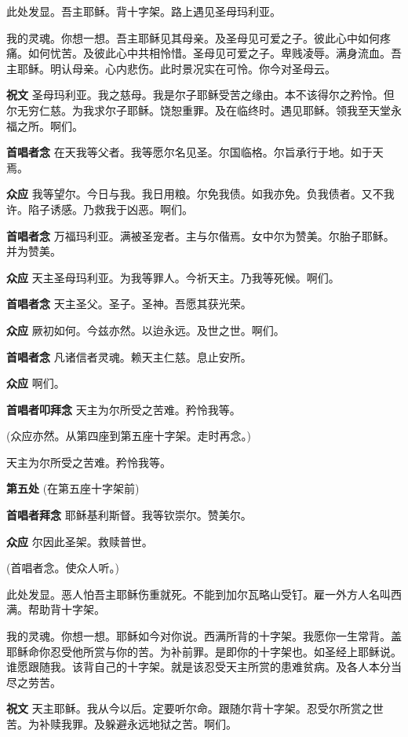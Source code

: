 \documentclass[UTF8,17pt]{ctexart}
\begin{document}
此处发显。吾主耶稣。背⼗字架。路上遇见圣母玛利亚。

我的灵魂。你想⼀想。吾主耶稣见其母亲。及圣母见可爱之⼦。彼此⼼中如何疼痛。如何忧苦。及彼此⼼中共相怜惜。圣母见可爱之⼦。卑贱凌辱。满⾝流⾎。吾主耶稣。明认母亲。⼼内悲伤。此时景况实在可怜。你今对圣母云。

\textbf{祝⽂} \quad 圣母玛利亚。我之慈母。我是尔⼦耶稣受苦之缘由。本不该得尔之矜怜。但尔⽆穷仁慈。为我求尔⼦耶稣。饶恕重罪。及在临终时。遇见耶稣。领我⾄天堂永福之所。啊们。

\textbf{⾸唱者念} \quad 在天我等⽗者。我等愿尔名见圣。尔国临格。尔旨承⾏于地。如于天焉。

\textbf{众应} \quad 我等望尔。今⽇与我。我⽇⽤粮。尔免我债。如我亦免。负我债者。又不我许。陷⼦诱感。乃救我于凶恶。啊们。

\textbf{⾸唱者念} \quad 万福玛利亚。满被圣宠者。主与尔偕焉。⼥中尔为赞美。尔胎⼦耶稣。并为赞美。

\textbf{众应} \quad 天主圣母玛利亚。为我等罪⼈。今祈天主。乃我等死候。啊们。

\textbf{⾸唱者念} \quad 天主圣⽗。圣⼦。圣神。吾愿其获光荣。

\textbf{众应} \quad 厥初如何。今兹亦然。以迨永远。及世之世。啊们。

\textbf{⾸唱者念} \quad 凡诸信者灵魂。赖天主仁慈。息⽌安所。

\textbf{众应} \quad 啊们。


\textbf{⾸唱者叩拜念} \quad 天主为尔所受之苦难。矜怜我等。

(众应亦然。从第四座到第五座⼗字架。⾛时再念。)

天主为尔所受之苦难。矜怜我等。

\textbf{第五处} (在第五座⼗字架前)

\textbf{⾸唱者拜念} \quad 耶稣基利斯督。我等钦崇尔。赞美尔。

\textbf{众应} \quad 尔因此圣架。救赎普世。

(⾸唱者念。使众⼈听。)

此处发显。恶⼈怕吾主耶稣伤重就死。不能到加尔⽡略⼭受钉。雇⼀外⽅⼈名叫西满。帮助背⼗字架。

我的灵魂。你想⼀想。耶稣如今对你说。西满所背的⼗字架。我愿你⼀⽣常背。盖耶稣命你忍受他所赏与你的苦。为补前罪。是即你的⼗字架也。如圣经上耶稣说。谁愿跟随我。该背⾃⼰的⼗字架。就是该忍受天主所赏的患难贫病。及各⼈本分当尽之劳苦。

\textbf{祝⽂} \quad 天主耶稣。我从今以后。定要听尔命。跟随尔背⼗字架。忍受尔所赏之世苦。为补赎我罪。及躲避永远地狱之苦。啊们。
\end{document}
